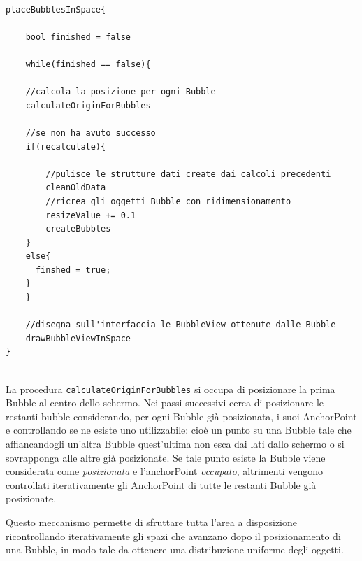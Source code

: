 \begin{lstlisting}[label=algo:2,caption=placeBubblesInSpace,breaklines=true]

placeBubblesInSpace{
    
    bool finished = false
    
    while(finished == false){
    
	//calcola la posizione per ogni Bubble
	calculateOriginForBubbles
	
	//se non ha avuto successo
	if(recalculate){
	
	    //pulisce le strutture dati create dai calcoli precedenti
	    cleanOldData 
	    //ricrea gli oggetti Bubble con ridimensionamento
	    resizeValue += 0.1
	    createBubbles 
	}
	else{
	  finshed = true;
	}
    }
    
    //disegna sull'interfaccia le BubbleView ottenute dalle Bubble
    drawBubbleViewInSpace
}


\end{lstlisting}


La procedura \texttt{calculateOriginForBubbles} si occupa di posizionare la prima Bubble al centro dello schermo. Nei passi successivi cerca di posizionare le restanti bubble considerando, per ogni Bubble già posizionata, i suoi AnchorPoint e controllando se ne esiste uno utilizzabile: cioè un punto su una Bubble tale che affiancandogli un'altra Bubble quest'ultima non esca dai lati dallo schermo o si sovrapponga alle altre già posizionate. Se tale punto esiste la Bubble viene considerata come \emph{posizionata} e l'anchorPoint \emph{occupato}, altrimenti vengono controllati iterativamente gli AnchorPoint di tutte le restanti Bubble già posizionate.

Questo meccanismo permette di sfruttare tutta l'area a disposizione ricontrollando iterativamente gli spazi che avanzano dopo il posizionamento di una Bubble, in modo tale da ottenere una distribuzione uniforme degli oggetti.

